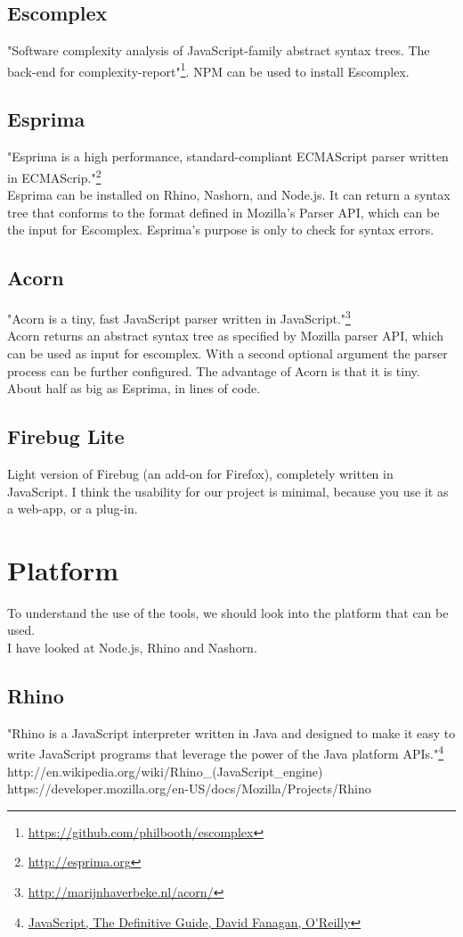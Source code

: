 \documentclass{article}
\begin{document}
\subsection{Escomplex}
"Software complexity analysis of JavaScript-family abstract syntax trees. The back-end for complexity-report"\footnote{\url{https://github.com/philbooth/escomplex}}.
NPM can be used to install Escomplex.

\subsection{Esprima}
"Esprima is a high performance, standard-compliant ECMAScript parser written in ECMAScrip."\footnote{\url{http://esprima.org}}\\
Esprima can be installed on Rhino, Nashorn, and Node.js.
It can return a syntax tree that conforms to the format defined in Mozilla's Parser API, which can be the input for Escomplex.
Esprima's purpose is only to check for syntax errors.

\subsection{Acorn}
"Acorn is a tiny, fast JavaScript parser written in JavaScript."\footnote{\url{http://marijnhaverbeke.nl/acorn/}}\\
Acorn returns an abstract syntax tree as specified by Mozilla parser API, which can be used as input for escomplex.
With a second optional argument the parser process can be further configured.
The advantage of Acorn is that it is tiny. About half as big as Esprima, in lines of code.

\subsection {Firebug Lite}
Light version of Firebug (an add-on for Firefox), completely written in JavaScript.
I think the usability for our project is minimal, because you use it as a web-app, or a plug-in.

\section{Platform}
To understand the use of the tools, we should look into the platform that can be used.\\
I have looked at Node.js, Rhino and Nashorn.

\subsection{Rhino}
"Rhino is a JavaScript interpreter written in Java and designed to make it easy to write JavaScript programs 
that leverage the power of the Java platform APIs."\footnote{\url{JavaScript, The Definitive Guide, David Fanagan, O'Reilly}}\newline
http://en.wikipedia.org/wiki/Rhino\_(JavaScript\_engine)
https://developer.mozilla.org/en-US/docs/Mozilla/Projects/Rhino
\end{document}
